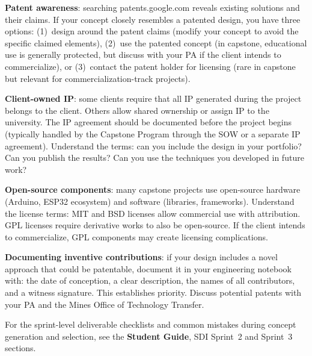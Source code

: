 \textbf{Patent awareness}: searching patents.google.com reveals existing solutions and their claims. If your concept closely resembles a patented design, you have three options: (1)~design around the patent claims (modify your concept to avoid the specific claimed elements), (2)~use the patented concept (in capstone, educational use is generally protected, but discuss with your PA if the client intends to commercialize), or (3)~contact the patent holder for licensing (rare in capstone but relevant for commercialization-track projects).

\textbf{Client-owned IP}: some clients require that all IP generated during the project belongs to the client. Others allow shared ownership or assign IP to the university. The IP agreement should be documented before the project begins (typically handled by the Capstone Program through the SOW or a separate IP agreement). Understand the terms: can you include the design in your portfolio? Can you publish the results? Can you use the techniques you developed in future work?

\textbf{Open-source components}: many capstone projects use open-source hardware (Arduino, ESP32 ecosystem) and software (libraries, frameworks). Understand the license terms: MIT and BSD licenses allow commercial use with attribution. GPL licenses require derivative works to also be open-source. If the client intends to commercialize, GPL components may create licensing complications.

\textbf{Documenting inventive contributions}: if your design includes a novel approach that could be patentable, document it in your engineering notebook with: the date of conception, a clear description, the names of all contributors, and a witness signature. This establishes priority. Discuss potential patents with your PA and the Mines Office of Technology Transfer.


\begin{tipbox}
For the sprint-level deliverable checklists and common mistakes during concept generation and selection, see the \textbf{Student Guide}, SDI Sprint~2 and Sprint~3 sections.
\end{tipbox}

